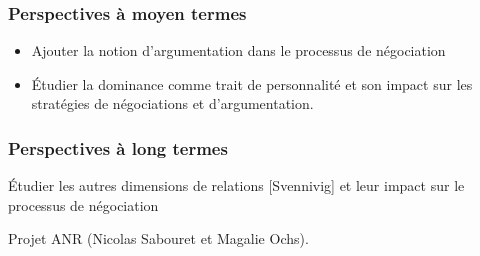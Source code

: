 \documentclass [french]{article}
\begin{document}
			\subsubsection{Perspectives à moyen termes}
			\begin{itemize}
				\item	Ajouter la notion d'argumentation dans le processus de négociation
				\item	Étudier la dominance comme trait de personnalité et son impact sur les stratégies de négociations et d'argumentation.

			\end{itemize}

			\subsubsection{Perspectives à long termes}
				Étudier les autres dimensions de relations [Svennivig] et leur impact sur le processus de négociation
				
				Projet ANR (Nicolas Sabouret et Magalie Ochs).
\end{document}
